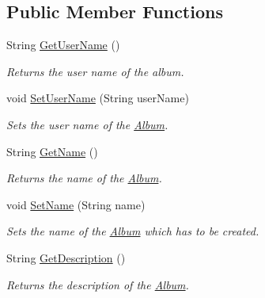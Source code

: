 \subsection*{Public Member Functions}
\begin{DoxyCompactItemize}
\item 
String \hyperlink{classcom_1_1shephertz_1_1app42_1_1paas_1_1sdk_1_1csharp_1_1gallery_1_1_album_a027366a23e84db47e94893956ea39a91}{Get\+User\+Name} ()
\begin{DoxyCompactList}\small\item\em Returns the user name of the album. \end{DoxyCompactList}\item 
void \hyperlink{classcom_1_1shephertz_1_1app42_1_1paas_1_1sdk_1_1csharp_1_1gallery_1_1_album_a1ec2bafe9dccd998d4b92c0f84a2a482}{Set\+User\+Name} (String user\+Name)
\begin{DoxyCompactList}\small\item\em Sets the user name of the \hyperlink{classcom_1_1shephertz_1_1app42_1_1paas_1_1sdk_1_1csharp_1_1gallery_1_1_album}{Album}. \end{DoxyCompactList}\item 
String \hyperlink{classcom_1_1shephertz_1_1app42_1_1paas_1_1sdk_1_1csharp_1_1gallery_1_1_album_a368bb311f138b674f70a40a8f9f6309e}{Get\+Name} ()
\begin{DoxyCompactList}\small\item\em Returns the name of the \hyperlink{classcom_1_1shephertz_1_1app42_1_1paas_1_1sdk_1_1csharp_1_1gallery_1_1_album}{Album}. \end{DoxyCompactList}\item 
void \hyperlink{classcom_1_1shephertz_1_1app42_1_1paas_1_1sdk_1_1csharp_1_1gallery_1_1_album_a800c356cd5fed21e784005d7900c4e67}{Set\+Name} (String name)
\begin{DoxyCompactList}\small\item\em Sets the name of the \hyperlink{classcom_1_1shephertz_1_1app42_1_1paas_1_1sdk_1_1csharp_1_1gallery_1_1_album}{Album} which has to be created. \end{DoxyCompactList}\item 
String \hyperlink{classcom_1_1shephertz_1_1app42_1_1paas_1_1sdk_1_1csharp_1_1gallery_1_1_album_a048d0181514ef34565304a7a6b0d1ed7}{Get\+Description} ()
\begin{DoxyCompactList}\small\item\em Returns the description of the \hyperlink{classcom_1_1shephertz_1_1app42_1_1paas_1_1sdk_1_1csharp_1_1gallery_1_1_album}{Album}. \end{DoxyCompactList}\item 

\end{DoxyCompactItemize}
